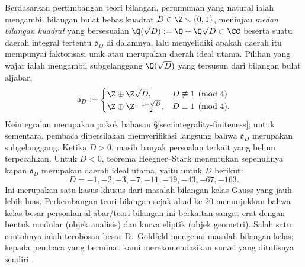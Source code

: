 Berdasarkan pertimbangan teori bilangan, perumuman yang natural ialah mengambil bilangan bulat bebas kuadrat $D \in \Z \smallsetminus \{0,1\}$, meninjau \emph{medan bilangan kuadrat} yang bersesuaian $\Q(\sqrt{D}) := \Q + \Q\sqrt{D} \subset \CC$ beserta suatu daerah integral tertentu $\mathfrak{o}_D$ di dalamnya, lalu menyelidiki apakah daerah itu mempunyai faktorisasi unik atau merupakan daerah ideal utama. Pilihan yang wajar ialah mengambil subgelanggang $\Q(\sqrt{D})$ yang tersusun dari bilangan bulat aljabar,
\begin{equation}\label{eqn:quadratic-integer} \mathfrak{o}_D := \begin{cases}
	\Z \oplus \Z \sqrt{D}, & D \not\equiv 1 \pmod 4 \\
	\Z \oplus \Z \cdot \frac{1 + \sqrt{D}}{2}, & D \equiv 1 \pmod 4.
\end{cases}\end{equation}
Keintegralan merupakan pokok bahasan \S\ref{sec:integrality-finiteness}; untuk sementara, pembaca dipersilakan memverifikasi langsung bahwa $\mathfrak{o}_D$ merupakan subgelanggang. Ketika $D>0$, masih banyak persoalan terkait yang belum terpecahkan. Untuk $D < 0$, teorema Heegner--Stark menentukan sepenuhnya kapan $\mathfrak{o}_D$ merupakan daerah ideal utama, yaitu untuk $D$ berikut:
\[ D = -1, -2, -3, -7, -11, -19, -43, -67, -163. \]
Ini merupakan satu kasus khusus dari masalah bilangan kelas Gauss yang jauh lebih luas. Perkembangan teori bilangan sejak abad ke-20 menunjukkan bahwa kelas besar persoalan aljabar/teori bilangan ini berkaitan sangat erat dengan bentuk modular (objek analisis) dan kurva eliptik (objek geometri). Salah satu contohnya ialah terobosan besar D.\ Goldfeld mengenai masalah bilangan kelas; kepada pembaca yang berminat kami merekomendasikan survei yang ditulisnya sendiri \cite{Go85}.

